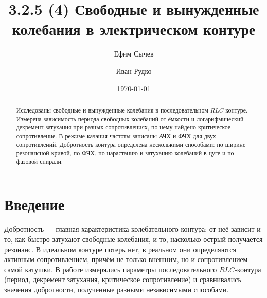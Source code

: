 \documentclass[reprint, amsmath, amssymb, aps, pra, nofootinbib]{revtex4-2}
\begin{document}
\title{3.2.5 (4) Свободные и вынужденные колебания в электрическом контуре}

\author{Ефим Сычев}

\author{Иван Рудко}

\date{\today}
\begin{abstract}
Исследованы свободные и вынужденные колебания в последовательном $RLC$-контуре. Измерена зависимость периода свободных колебаний от ёмкости и логарифмический декремент затухания при разных сопротивлениях, по нему найдено критическое сопротивление. В режиме качания частоты записаны АЧХ и ФЧХ для двух сопротивлений. Добротность контура определена несколькими способами: по ширине резонансной кривой, по ФЧХ, по нарастанию и затуханию колебаний в цуге и по фазовой спирали.
\end{abstract}

\maketitle

\section{Введение}
Добротность — главная характеристика колебательного контура: от неё зависит и то, как быстро затухают свободные колебания, и то, насколько острый получается резонанс. В идеальном контуре потерь нет, в реальном они определяются активным сопротивлением, причём не только внешним, но и сопротивлением самой катушки. В работе измерялись параметры последовательного $RLC$-контура (период, декремент затухания, критическое сопротивление) и сравнивались значения добротности, полученные разными независимыми способами.
\end{document}
